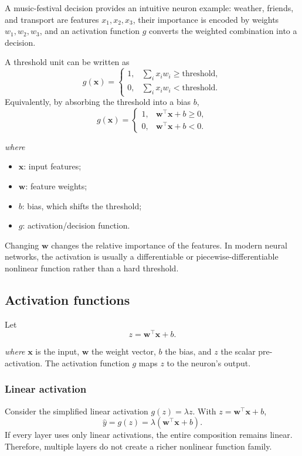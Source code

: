 \documentclass[11pt,a4paper]{report}
\newcommand{\vect}[1]{\bm{#1}}
\newcommand{\wherelegend}{\par\smallskip\textit{where}\vspace{-0.3em}}
\begin{document}
A music-festival decision provides an intuitive neuron example: weather, friends, and transport are features $x_1,x_2,x_3$, their importance is encoded by weights $w_1,w_2,w_3$, and an activation function $g$ converts the weighted combination into a decision.

A threshold unit can be written as
\begin{equation}
  g(\vect{x})=
  \begin{cases}
    1, & \sum_i x_iw_i \ge \text{threshold},\\
    0, & \sum_i x_iw_i < \text{threshold}.
  \end{cases}
  \label{eq:threshold-unit}
\end{equation}
Equivalently, by absorbing the threshold into a bias $b$,
\begin{equation}
  g(\vect{x})=
  \begin{cases}
    1, & \vect{w}^{\top}\vect{x}+b \ge 0,\\
    0, & \vect{w}^{\top}\vect{x}+b < 0.
  \end{cases}
  \label{eq:threshold-bias}
\end{equation}
\wherelegend
\begin{itemize}
  \item $\vect{x}$: input features;
  \item $\vect{w}$: feature weights;
  \item $b$: bias, which shifts the threshold;
  \item $g$: activation/decision function.
\end{itemize}

Changing $\vect{w}$ changes the relative importance of the features. In modern neural networks, the activation is usually a differentiable or piecewise-differentiable nonlinear function rather than a hard threshold.

\subsection{Activation functions}

Let
\begin{equation}
  z=\vect{w}^{\top}\vect{x}+b.
  \label{eq:preactivation}
\end{equation}
\wherelegend
$\vect{x}$ is the input, $\vect{w}$ the weight vector, $b$ the bias, and $z$ the scalar pre-activation. The activation function $g$ maps $z$ to the neuron's output.

\subsubsection{Linear activation}
Consider the simplified linear activation $g(z)=\lambda z$. With $z=\vect{w}^{\top}\vect{x}+b$,
\begin{equation}
  \hat y=g(z)=\lambda\left(\vect{w}^{\top}\vect{x}+b\right).
\end{equation}
If every layer uses only linear activations, the entire composition remains linear. Therefore, multiple layers do not create a richer nonlinear function family.
\end{document}
